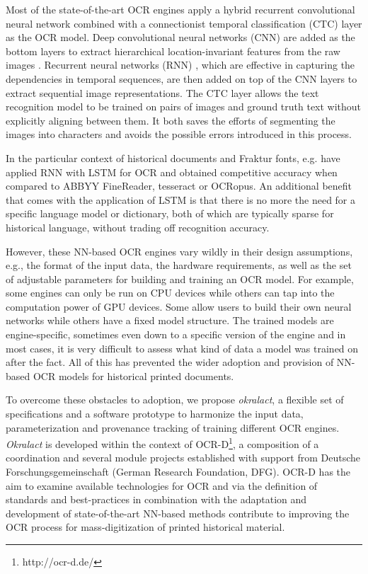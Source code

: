 \documentclass[conference]{IEEEtran}
\begin{document}
Most of the state-of-the-art OCR engines apply a hybrid recurrent convolutional
neural network combined with a connectionist temporal classification (CTC)
\cite{graves2006connectionist} layer as the OCR model. Deep convolutional
neural networks (CNN) \cite{krizhevsky2012imagenet} are added as the bottom
layers to extract hierarchical location-invariant features from the raw images
\cite{wick2018improving}. Recurrent neural networks (RNN)
\cite{mikolov2010recurrent}, which are effective in capturing the dependencies
in temporal sequences, are then added on top of the CNN layers to extract
sequential image representations. The CTC layer allows the text recognition
model to be trained on pairs of images and ground truth text without explicitly
aligning between them. It both saves the efforts of segmenting the images into
characters and avoids the possible errors introduced in this process.

In the particular context of historical documents and Fraktur fonts, e.g.
\cite{breuel2013high} have applied RNN with LSTM for OCR and obtained 
competitive accuracy when compared to ABBYY FineReader, tesseract or OCRopus. 
An additional benefit that comes with the application of LSTM is that there is
no more the need for a specific language model or dictionary, both of which are 
typically sparse for historical language, without trading off recognition accuracy.\cite{ul2013can}


However, these NN-based OCR engines vary wildly in their design
assumptions, e.g., the format of the input data, the hardware
requirements, as well as the set of adjustable parameters for
building and training an OCR model. For example, some engines can
only be run on CPU devices while others can tap into the
computation power of GPU devices. Some allow users to build their
own neural networks while others have a fixed model structure. The
trained models are engine-specific, sometimes even down to a specific
version of the engine and in most cases, it is very difficult to
assess what kind of data a model was trained on after the fact. All
of this has prevented the wider adoption and provision of NN-based 
OCR models for historical printed documents.

To overcome these obstacles to adoption, we propose
\textit{okralact}, a flexible set of specifications and a software
prototype to harmonize the input data, parameterization and
provenance tracking of training different OCR engines.
\textit{Okralact} is developed within the context of
OCR-D\footnote{http://ocr-d.de/}, a composition of a
coordination and several module projects established with support
from Deutsche Forschungsgemeinschaft (German Research Foundation,
DFG). OCR-D has the aim to examine available technologies for OCR and via the 
definition of standards and best-practices in combination with the adaptation and development of state-of-the-art NN-based methods contribute to improving the OCR process for mass-digitization of 
printed historical material.\cite{neudecker2019datech}  
\end{document}
